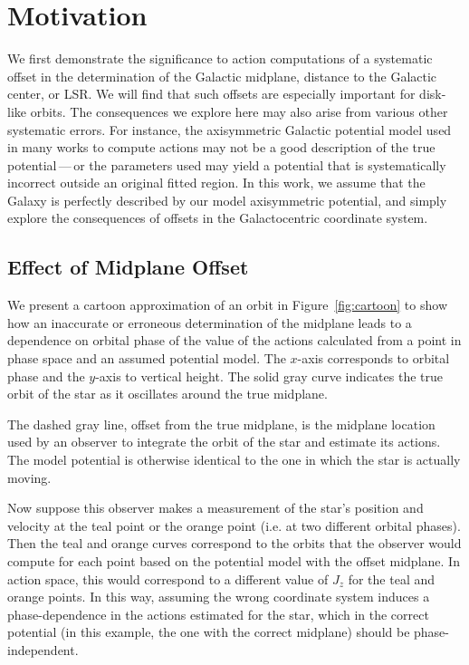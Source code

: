 \documentclass[twocolumn]{aastex62}
\begin{document}
\section{Motivation} \label{sec:ref_frame}
We first demonstrate the significance to action computations of a systematic
offset in the determination of the Galactic midplane, distance to the Galactic
center, or LSR. We will find that such offsets are especially important for
disk-like orbits. The consequences we explore here may also arise from various
other systematic errors. For instance, the axisymmetric Galactic potential model
used in many works to compute actions may not be a good description of the true
potential\,---\,or the parameters used may yield a potential that is
systematically incorrect outside an original fitted region. In this work, we
assume that the Galaxy is perfectly described by our model axisymmetric
potential, and simply explore the consequences of offsets in the Galactocentric
coordinate system.

\subsection{Effect of Midplane Offset} \label{ssec:cartoon}
We present a cartoon approximation of an orbit in Figure~\ref{fig:cartoon} to
show how an inaccurate or erroneous determination of the midplane leads to a
dependence on orbital phase of the value of the actions calculated
from a point in phase space and an
assumed potential model. The $x$-axis corresponds to orbital phase and the
$y$-axis to vertical height. The solid gray curve indicates the 
true orbit of the star as it oscillates around the true midplane.

The dashed gray line, offset from the true midplane, is the midplane location
used by an observer to integrate the orbit of the star and estimate its actions.
The model potential is otherwise identical to the one in which the star is
actually moving.

Now suppose this observer makes a measurement of the star's position and
velocity at the teal point or the orange point (i.e. at two different orbital
phases). Then the teal and orange curves correspond to the orbits that the
observer would compute for each point based on the potential model with the
offset midplane. In action space, this would correspond to a different value of
$J_z$ for the teal and orange points. In this way, assuming the wrong coordinate
system induces a phase-dependence in the actions estimated for the star, which
in the correct potential (in this example, the one with the correct midplane)
should be phase-independent.
\end{document}
